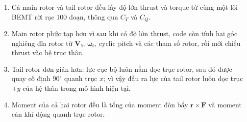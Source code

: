 \documentclass[11pt,a4paper]{article}
\newcommand{\vect}[1]{\boldsymbol{#1}}
\begin{document}
\begin{enumerate}[leftmargin=1.8em]
  \item Cả main rotor và tail rotor đều lấy độ lớn thrust và torque từ cùng một
        lõi BEMT rời rạc 100 đoạn, thông qua \(C_T\) và \(C_Q\).
  \item Main rotor phức tạp hơn vì sau khi có độ lớn thrust, code còn tính hai
        góc nghiêng đĩa rotor từ \(\vect{V}_b\), \(\vect{\omega}_b\), cyclic
        pitch và các tham số rotor, rồi mới chiếu thrust vào hệ trục thân.
  \item Tail rotor đơn giản hơn: lực cục bộ luôn nằm dọc trục rotor, sau đó
        được quay cố định \(90^\circ\) quanh trục \(x\); vì vậy đầu ra lực của
        tail rotor luôn dọc trục \(+y\) của hệ thân trong mô hình hiện tại.
  \item Moment của cả hai rotor đều là tổng của moment đòn bẩy
        \(\vect{r}\times\vect{F}\) và moment cản khí động quanh trục rotor.
\end{enumerate}
\end{document}
